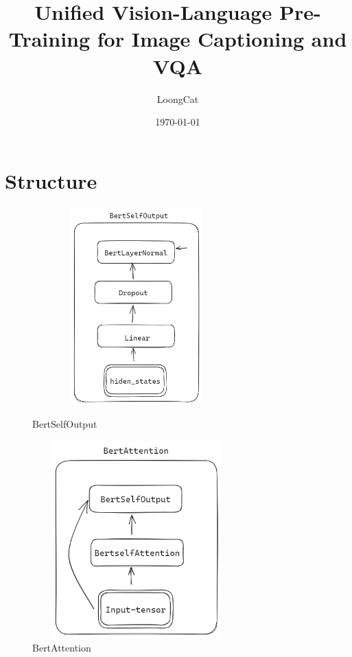 \documentclass[a4paper]{article}
\title{Unified Vision-Language Pre-Training for Image Captioning and VQA}
\author{LoongCat}
\date{\today}
\begin{document}
\begin{sloppypar}
    \maketitle
    \section{Structure}


    \begin{figure}[H]
        \centering
        \begin{minipage}{0.49\linewidth}
            \centering
            \includegraphics[width=3.15in,height=3.0in]{BertOutput}
            \caption{BertSelfOutput}
            \label{BertSelfOutput}%
        \end{minipage}
        \begin{minipage}{0.49\linewidth}
            \centering
            \includegraphics[width=3.15in,height=3.0in]{BertAttention}
            \caption{BertAttention}
            \label{BertAttention}%
        \end{minipage}


\end{figure}
\end{sloppypar}
\end{document}
